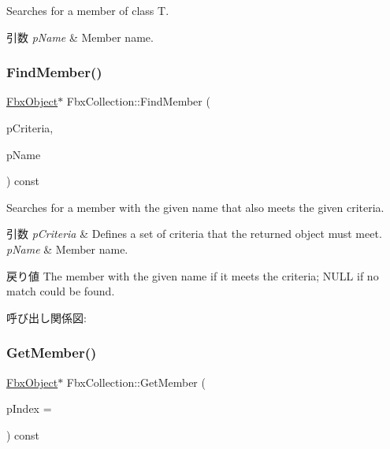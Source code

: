 Searches for a member of class T. 
\begin{DoxyParams}{引数}
{\em p\+Name} & Member name. \\
\hline
\end{DoxyParams}
\mbox{\label{class_fbx_collection_a72875fa801308b233f5e1cb04cf66bb4}} 
\subsubsection{\texorpdfstring{Find\+Member()}{FindMember()}\hspace{0.1cm}{\footnotesize\ttfamily [2/2]}}
{\footnotesize\ttfamily \hyperlink{class_fbx_object}{Fbx\+Object}$\ast$ Fbx\+Collection\+::\+Find\+Member (\begin{DoxyParamCaption}\item[{const \hyperlink{class_fbx_criteria}{Fbx\+Criteria} \&}]{p\+Criteria,  }\item[{const char $\ast$}]{p\+Name }\end{DoxyParamCaption}) const}

Searches for a member with the given name that also meets the given criteria. 
\begin{DoxyParams}{引数}
{\em p\+Criteria} & Defines a set of criteria that the returned object must meet. \\
\hline
{\em p\+Name} & Member name. \\
\hline
\end{DoxyParams}
\begin{DoxyReturn}{戻り値}
The member with the given name if it meets the criteria; N\+U\+LL if no match could be found. 
\end{DoxyReturn}
呼び出し関係図\+:
\mbox{\label{class_fbx_collection_a79c52e9fdd2c04a29b5ba04ff7e15bc6}} 
\subsubsection{\texorpdfstring{Get\+Member()}{GetMember()}\hspace{0.1cm}{\footnotesize\ttfamily [1/3]}}
{\footnotesize\ttfamily \hyperlink{class_fbx_object}{Fbx\+Object}$\ast$ Fbx\+Collection\+::\+Get\+Member (\begin{DoxyParamCaption}\item[{int}]{p\+Index = {} }\end{DoxyParamCaption}) const}


